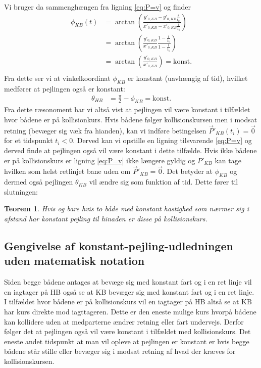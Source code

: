 \documentclass[%
 reprint,
nofootinbib,
aps,
]{revtex4-1}
\newtheorem{theorem}{Teorem}
\begin{document}
Vi bruger da sammenghængen fra ligning \ref{eq:P=v} og finder
\begin{align*}
  \phi_{KB}(t) &= \arctan{\left( \frac{y'_{0,KB} - y'_{0,KB}\frac{t}{t_k}}{x'_{0,KB} - x'_{0,KB}\frac{t}{t_k}}\right)} \\
  &= \arctan{\left(\frac{y'_{0,KB}}{x'_{0,KB}} \frac{1 - \frac{t}{t_k}}{1 - \frac{t}{t_k}}\right)} \\
  &= \arctan{\left(\frac{y'_{0,KB}}{x'_{0,KB}}\right)} = \text{konst.} \\
\end{align*}
Fra dette ser vi at vinkelkoordinat $\phi_{KB}$ er konstant (uavhængig af tid), hvilket medfører at pejlingen også er konstant:
\begin{align*}
  \theta_{HB} &= \frac{\pi}{2} - \phi_{KB} = \text{konst.}
\end{align*}
Fra dette ræsonoment har vi altså vist at pejlingen vil være konstant i tilfældet hvor bådene er på kollisionkurs. Hvis bådene følger kollisionskursen men i modsat retning (bevæger sig væk fra hianden), kan vi indføre betingelsen $\vec{P}'_{KB}(t_i) = \vec{0}$ for et tidspunkt $t_i < 0$. Derved kan vi opstille en ligning tilsvarende \ref{eq:P=v} og derved finde at pejlingen også vil være konstant i dette tilfælde. Hvis ikke bådene er på kollisionskurs er ligning \ref{eq:P=v} ikke længere gyldig og $P'_{KB}$ kan tage hvilken som helst retlinjet bane uden om $\vec{P}'_{KB} = \vec{0}$. Det betyder at $\phi_{KB}$ og dermed også pejlingen $\theta_{KB}$ vil ændre sig som funktion af tid. Dette fører til slutningen:
\begin{theorem}
  Hvis og bare hvis to både med konstant hastighed som nærmer sig i afstand har konstant pejling til hinaden er disse på kollisionskurs.
  \label{Teo:pejling}
\end{theorem}
\subsection{Gengivelse af konstant-pejling-udledningen uden matematisk notation}
Siden begge bådene antages at bevæge sig med konstant fart og i en ret linje vil en iagtager på HB også se at KB bevæger sig med konstant fart og i en ret linje. I tilfældet hvor bådene er på kollisionskurs vil en iagtager på HB altså se at KB har kurs direkte mod iagttageren. Dette er den eneste mulige kurs hvorpå bådene kan kollidere uden at medparterne ændrer retning eller fart undervejs. Derfor følger det at pejlingen også vil være konstant i tilfældet med kollisionskurs. Det eneste andet tidspunkt at man vil opleve at pejlingen er konstant er hvis begge bådene står stille eller bevæger sig i modsat retning af hvad der kræves for kollisionskursen.
\end{document}
